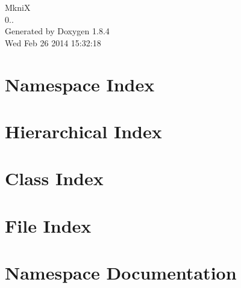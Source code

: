 \documentclass[twoside]{article}
\begin{document}
\hypersetup{pageanchor=false}
\begin{titlepage}
\vspace*{7cm}
\begin{center}%
{\Large Mkni\-X \\[1ex]\large 0.. }\\
\vspace*{1cm}
{\large Generated by Doxygen 1.8.4}\\
\vspace*{0.5cm}
{\small Wed Feb 26 2014 15:32:18}\\
\end{center}
\end{titlepage}
\tableofcontents
{}
\hypersetup{pageanchor=true}

\section{Namespace Index}

\section{Hierarchical Index}

\section{Class Index}

\section{File Index}

\section{Namespace Documentation}

\end{document}
